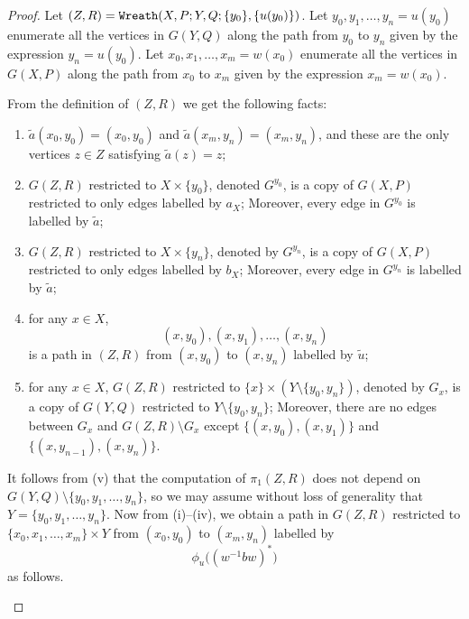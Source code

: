\documentclass[10pt,a4paper]{amsart}
\theoremstyle{definition}
\theoremstyle{definition}
\numberwithin{equation}{section}
\begin{document}
\begin{proof} Let $(Z, R)=\mbox{\tt Wreath}(X,P; Y, Q; \{y_0\}, \{u(y_0)\})$. Let $y_0, y_1, \dots, y_n=u(y_0)$ enumerate all the vertices in $G(Y, Q)$ along the path from $y_0$ to $y_n$ given by the expression $y_n=u(y_0)$. Let $x_0, x_1, \dots, x_m=w(x_0)$ enumerate all the vertices in $G(X, P)$ along the path from $x_0$ to $x_m$ given by the expression $x_m=w(x_0)$. 

From the definition of $(Z, R)$ we get the following facts:
\begin{enumerate}
\item[(i)] $\tilde{a}(x_0, y_0)=(x_0, y_0)$ and $\tilde{a}(x_m, y_n)=(x_m, y_n)$, and these are the only vertices $z\in Z$ satisfying $\tilde{a}(z)=z$;
\item[(ii)] $G(Z, R)$ restricted to $X\times \{y_0\}$, denoted $G^{y_0}$, is a copy of $G(X, P)$ restricted to only edges labelled by $a_X$; Moreover, every edge in $G^{y_0}$ is labelled by $\tilde{a}$;
\item[(iii)] $G(Z, R)$ restricted to $X\times \{y_n\}$, denoted by $G^{y_n}$, is a copy of $G(X, P)$ restricted to only edges labelled by $b_X$; Moreover, every edge in $G^{y_n}$ is labelled by $\tilde{a}$;
\item[(iv)] for any $x\in X$, 
$$ (x, y_0), (x, y_1), \dots, (x, y_n) $$
is a path in $(Z, R)$ from $(x, y_0)$ to $(x, y_n)$ labelled by $\tilde{u}$;
\item[(v)] for any $x\in X$, $G(Z, R)$ restricted to $\{x\}\times (Y\setminus\{y_0, y_n\})$, denoted by $G_x$, is a copy of $G(Y, Q)$ restricted to $Y\setminus \{y_0, y_n\}$; Moreover, there are no edges between $G_x$ and $G(Z, R)\setminus G_x$ except $\{(x, y_0), (x, y_1)\}$ and $\{(x, y_{n-1}), (x, y_n)\}$.
\end{enumerate}
It follows from (v) that the computation of $\pi_1(Z, R)$ does not depend on $G(Y, Q)\setminus\{y_0, y_1, \dots, y_n\}$, so we may assume without loss of generality that $Y=\{y_0, y_1, \dots, y_n\}$. Now from (i)--(iv), we obtain a path in $G(Z, R)$ restricted to $\{x_0, x_1,\dots, x_m\}\times Y$ from $(x_0, y_0)$ to $(x_m, y_n)$ labelled by 
$$\phi_u\big((w^{-1}bw)^*\big)$$ as follows.

\begin{figure}[htbp]
\centering
{}
\end{figure}
\end{proof}
\end{document}
